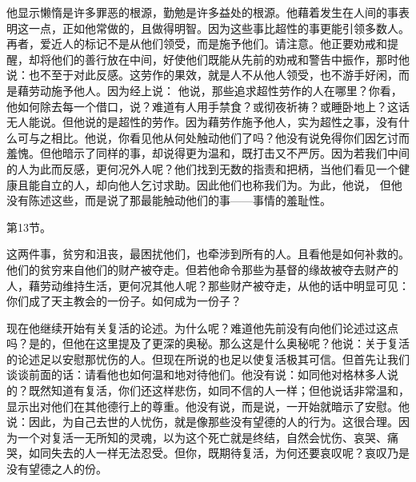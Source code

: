 他显示懒惰是许多罪恶的根源，勤勉是许多益处的根源。他藉着发生在人间的事表明这一点，正如他常做的，且做得明智。因为这些事比超性的事更能引领多数人。再者，爱近人的标记不是从他们领受，而是施予他们。请注意。他正要劝戒和提醒，却将他们的善行放在中间，好使他们既能从先前的劝戒和警告中振作，那时他说：也不至于对此反感。这劳作的果效，就是人不从他人领受，也不游手好闲，而是藉劳动施予他人。因为经上说： 他说，那些追求超性劳作的人在哪里？你看，他如何除去每一个借口，说？难道有人用手禁食？或彻夜祈祷？或睡卧地上？这话无人能说。但他说的是超性的劳作。因为藉劳作施予他人，实为超性之事，没有什么可与之相比。他说，你看见他从何处触动他们了吗？他没有说免得你们因乞讨而羞愧。但他暗示了同样的事，却说得更为温和，既打击又不严厉。因为若我们中间的人为此而反感，更何况外人呢？他们找到无数的指责和把柄，当他们看见一个健康且能自立的人，却向他人乞讨求助。因此他们也称我们为。为此，他说， 但他没有陈述这些，而是说了那最能触动他们的事——事情的羞耻性。\par

第13节。\par

这两件事，贫穷和沮丧，最困扰他们，也牵涉到所有的人。且看他是如何补救的。他们的贫穷来自他们的财产被夺走。但若他命令那些为基督的缘故被夺去财产的人，藉劳动维持生活，更何况其他人呢？那些财产被夺走，从他的话中明显可见：你们成了天主教会的一份子。如何成为一份子？\par

现在他继续开始有关复活的论述。为什么呢？难道他先前没有向他们论述过这点吗？是的，但他在这里提及了更深的奥秘。那么这是什么奥秘呢？他说：关于复活的论述足以安慰那忧伤的人。但现在所说的也足以使复活极其可信。但首先让我们谈谈前面的话：请看他也如何温和地对待他们。他没有说：如同他对格林多人说的？既然知道有复活，你们还这样悲伤，如同不信的人一样；但他说话非常温和，显示出对他们在其他德行上的尊重。他没有说，而是说，一开始就暗示了安慰。他说：因此，为自己去世的人忧伤，就是像那些没有望德的人的行为。这很合理。因为一个对复活一无所知的灵魂，以为这个死亡就是终结，自然会忧伤、哀哭、痛哭，如同失去的人一样无法忍受。但你，既期待复活，为何还要哀叹呢？哀叹乃是没有望德之人的份。\par

